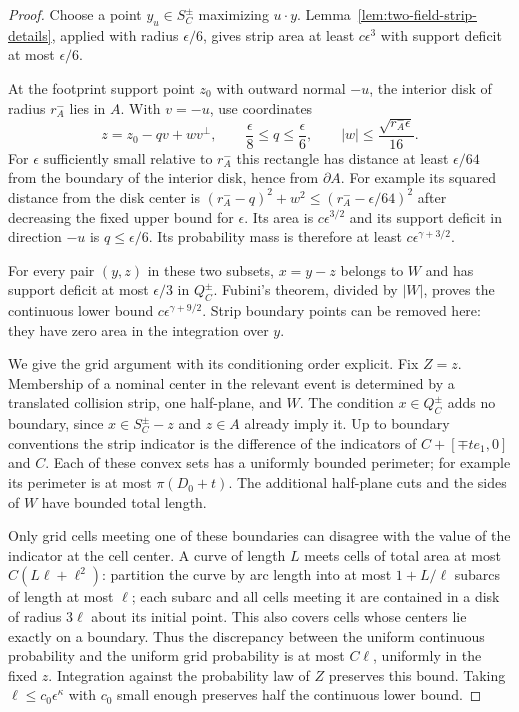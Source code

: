 \begin{proof}
Choose a point $y_u\in S_C^\pm$ maximizing $u\cdot y$.
Lemma~\ref{lem:two-field-strip-details}, applied with radius
$\epsilon/6$, gives strip area at least $c\epsilon^3$ with
support deficit at most $\epsilon/6$.

At the footprint support point $z_0$ with outward normal $-u$,
the interior disk of radius $r_A^-$ lies in $A$.  With $v=-u$,
use coordinates
\[
 z=z_0-qv+w v^\perp,\qquad
 \frac\epsilon8\le q\le\frac\epsilon6,
 \qquad |w|\le\frac{\sqrt{r_A^-\epsilon}}{16}.
\]
For $\epsilon$ sufficiently small relative to $r_A^-$ this
rectangle has distance at least $\epsilon/64$ from the boundary
of the interior disk, hence from $\partial A$.  For example its
squared distance from the disk center is
$(r_A^--q)^2+w^2\le(r_A^--\epsilon/64)^2$ after decreasing
the fixed upper bound for $\epsilon$.
Its area is $c\epsilon^{3/2}$ and its support deficit in
direction $-u$ is $q\le\epsilon/6$.  Its probability mass is
therefore at least $c\epsilon^{\gamma+3/2}$.

For every pair $(y,z)$ in these two subsets, $x=y-z$ belongs to
$W$ and has support deficit at most $\epsilon/3$ in $Q_C^\pm$.
Fubini's theorem, divided by $|W|$, proves the continuous lower
bound $c\epsilon^{\gamma+9/2}$.  Strip boundary points can be
removed here: they have zero area in the integration over $y$.

We give the grid argument with its conditioning order explicit.
Fix $Z=z$.  Membership of a nominal center in the relevant event
is determined by a translated collision strip, one half-plane,
and $W$.  The condition $x\in Q_C^\pm$ adds no boundary, since
$x\in S_C^\pm-z$ and $z\in A$ already imply it.
Up to boundary conventions the strip indicator is the difference
of the indicators of $C+[\mp te_1,0]$ and $C$.
Each of these convex sets has a uniformly bounded perimeter; for
example its perimeter is at most $\pi(D_0+t)$.
The additional half-plane cuts and the sides of $W$ have bounded
total length.

Only grid cells meeting one of these boundaries can disagree with
the value of the indicator at the cell center.  A curve of length
$L$ meets cells of total area at most
$C(L\ell+\ell^2)$: partition the curve by arc length into
at most $1+L/\ell$ subarcs of length at most $\ell$; each
subarc and all cells meeting it are contained in a disk of radius
$3\ell$ about its initial point.  This also covers cells whose
centers lie exactly on a boundary.  Thus the discrepancy between
the uniform continuous probability and the uniform grid probability
is at most $C\ell$, uniformly in the fixed $z$.
Integration against the probability law of $Z$ preserves this
bound.  Taking $\ell\le c_0\epsilon^\kappa$ with $c_0$
small enough preserves half the continuous lower bound.
\end{proof}

